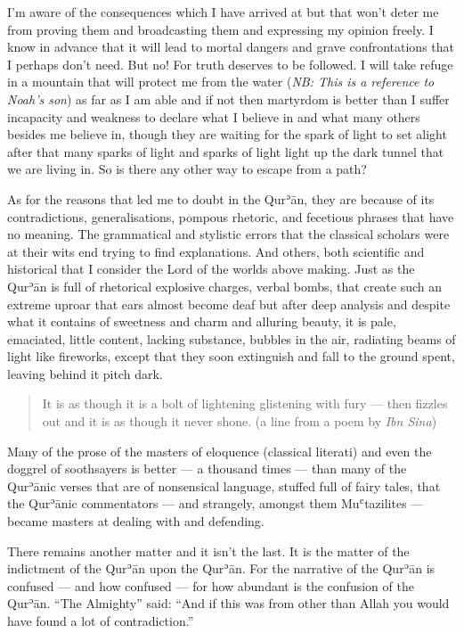 \documentclass[12pt]{memoir}
\def\´{ʾ} %
\def\`{ʿ} %
\def \Quran{Qur\-\´ān} %
\let \Qrn=\Quran      %
\newcommand{\NB}[1]{\emph{\small NB: #1}}
\begin{document}
I’m aware of the consequences which I have arrived at but that won’t deter me
from proving them and broadcasting them and expressing my opinion freely. I
know in advance that it will lead to mortal dangers and grave confrontations
that I perhaps don’t need. But no! For truth deserves to be followed. I will
take refuge in a mountain that will protect me from the water
(\NB{This is a reference to Noah’s son})
as far as I am able and if not then martyrdom is better than I suffer
incapacity and weakness to declare what I believe in and what many others
besides me believe in, though they are waiting for the spark of light to set
alight after that many sparks of light and sparks of light light up the dark
tunnel that we are living in. So is there any other way to escape from a path?

As for the reasons that led me to doubt in the \Quran, they are because of its
contradictions, generalisations, pompous rhetoric, and fecetious phrases that
have no meaning. The grammatical and stylistic errors that the classical
scholars were at their wits end trying to find explanations. And others, both
scientific and historical that I consider the Lord of the worlds above making.
Just as the \Qrn{} is full of rhetorical explosive charges, verbal bombs, that
create such an extreme uproar that ears almost become deaf but after deep
analysis and despite what it contains of sweetness and charm and alluring
beauty, it is pale, emaciated, little content, lacking substance, bubbles in
the air, radiating beams of light like fireworks, except that they soon
extinguish and fall to the ground spent, leaving behind it pitch dark.

\begin{quote}
It is as though it is a bolt of lightening glistening with fury — then fizzles
out and it is as though it never shone.
(a line from a poem by \emph{Ibn Sina})
\end{quote}

Many of the prose of the masters of eloquence (classical literati) and even the
doggrel of soothsayers is better — a thousand times — than many of the \Qrn{}ic
verses that are of nonsensical language, stuffed full of fairy tales, that the
\Quran{}ic commentators — and strangely, amongst them Mu\`tazilites — became
masters at dealing with and defending.

There remains another matter and it isn’t the last. It is the matter of the
indictment of the \Qrn{} upon the \Quran. For the narrative of the \Qrn{} is
confused — and how confused — for how abundant is the confusion of the \Quran.
“The Almighty” said: “And if this was from other than Allah you would have
found a lot of contradiction.”
\end{document}
